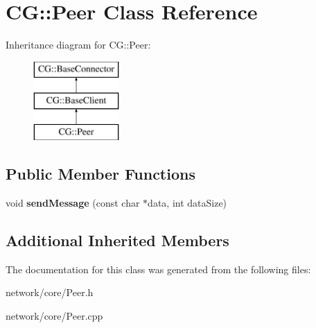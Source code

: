 \hypertarget{class_c_g_1_1_peer}{}\section{CG\+:\+:Peer Class Reference}
\label{class_c_g_1_1_peer}
Inheritance diagram for CG\+:\+:Peer\+:\begin{figure}[H]
\begin{center}
\leavevmode
\includegraphics[height=3.000000cm]{class_c_g_1_1_peer}
\end{center}
\end{figure}
\subsection*{Public Member Functions}
\begin{DoxyCompactItemize}
\item 
\mbox{\label{class_c_g_1_1_peer_ad7c328d003e82a45533302d09c273dc4}} 
void {\bfseries send\+Message} (const char $\ast$data, int data\+Size)
\end{DoxyCompactItemize}
\subsection*{Additional Inherited Members}


The documentation for this class was generated from the following files\+:\begin{DoxyCompactItemize}
\item 
network/core/Peer.\+h\item 
network/core/Peer.\+cpp\end{DoxyCompactItemize}

